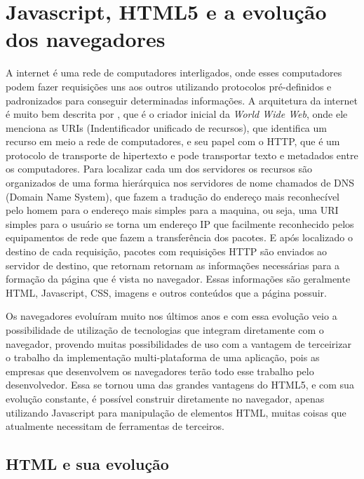 \section{Javascript, HTML5 e a evolução dos navegadores}

A internet é uma rede de computadores interligados, onde esses
computadores podem fazer requisições uns aos outros utilizando protocolos pré-definidos e
padronizados para conseguir determinadas informações.
A arquitetura da internet é muito bem descrita por
, que é o criador inicial da
\textit{World Wide Web}, onde ele menciona as URIs (Indentificador unificado de
recursos), que identifica um recurso em meio a rede de computadores, e
seu papel com o HTTP, que é um protocolo de transporte de hipertexto e
pode transportar texto e metadados entre os computadores.
Para localizar cada um dos servidores os recursos são organizados de
uma forma hierárquica nos servidores de nome chamados de DNS (Domain
Name System), que fazem a tradução do endereço mais reconhecível pelo
homem para o endereço mais simples para a maquina, ou seja, uma URI
simples para o usuário se torna um endereço IP que facilmente
reconhecido pelos equipamentos de rede que fazem a transferência dos
pacotes.
E após localizado o destino de cada requisição, pacotes com
requisições HTTP são enviados ao servidor de destino, que retornam
retornam as informações necessárias para a formação da página que é vista no
navegador. Essas informações são geralmente HTML, Javascript, CSS,
imagens e outros conteúdos que a página possuir.

Os navegadores evoluíram muito nos últimos anos e com essa evolução
veio a possibilidade de utilização de tecnologias que integram
diretamente com o navegador, provendo muitas possibilidades de uso com
a vantagem de terceirizar o trabalho da implementação multi-plataforma
de uma aplicação, pois as empresas que desenvolvem os navegadores
terão todo esse trabalho pelo desenvolvedor. Essa se tornou uma das
grandes vantagens do HTML5, e com sua evolução constante, é possível
construir diretamente no navegador, apenas utilizando Javascript para
manipulação de elementos HTML, muitas coisas que atualmente necessitam
de ferramentas de terceiros.

\subsection{HTML e sua evolução}


